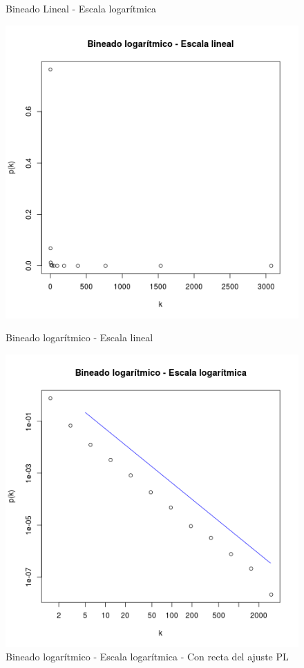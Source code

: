 \documentclass{article}
\begin{document}
\begin{figure}[!htb]
\begin{minipage}{0.3\textwidth}
	\caption{Bineado Lineal - Escala logarítmica}
	\label{pt3linloglog}
   \end{minipage}\hfill
      \begin{minipage}{0.3\textwidth}
	\centering
	\includegraphics[width=1.0\linewidth]{Imagenes_P3/P3_binlog_lin.png}
	\caption{Bineado logarítmico - Escala lineal}
	\label{pt3loglin}
   \end{minipage}\hfill
      \begin{minipage}{0.3\textwidth}
	\centering
	\includegraphics[width=1.0\linewidth]{Imagenes_P3/P3_binlog_log.png}
	\caption{Bineado logarítmico - Escala logarítmica - Con recta del ajuste PL}	
	\label{pt3loglog}
   \end{minipage}\hfill
   \label{pt2layout}
\end{figure}
\end{document}
